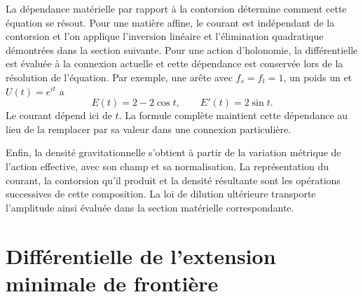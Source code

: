 La dépendance matérielle par rapport à la contorsion détermine comment
cette équation se résout. Pour une matière affine, le courant est indépendant
de la contorsion et l’on applique l’inversion linéaire et l’élimination
quadratique démontrées dans la section suivante. Pour une action
d’holonomie, la différentielle est évaluée à la connexion actuelle et cette
dépendance est conservée lors de la résolution de l’équation. Par exemple, une arête avec
\(f_s=f_t=1\), un poids un et \(U(t)=e^{it}\) a
\[
 E(t)=2-2\cos t,\qquad E'(t)=2\sin t.
\]
Le courant dépend ici de \(t\). La formule complète maintient
cette dépendance au lieu de la remplacer par sa valeur dans une connexion
particulière.

Enfin, la densité gravitationnelle s'obtient à partir de la variation
métrique de l'action effective, avec son champ et sa normalisation.
La représentation du courant, la contorsion qu'il produit et la
densité résultante sont les opérations successives de cette composition.
La loi de dilution ultérieure transporte l'amplitude ainsi évaluée dans
la section matérielle correspondante.




\chapter{Différentielle de l'extension minimale de frontière}
\label{x_reciprocidad:vii:sec:corriente-extension-minima}


